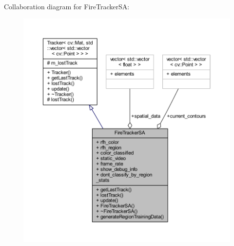 Collaboration diagram for Fire\+Tracker\+S\+A\+:
\nopagebreak
\begin{figure}[H]
\begin{center}
\leavevmode
\includegraphics[width=350pt]{class_fire_tracker_s_a__coll__graph}
\end{center}
\end{figure}
